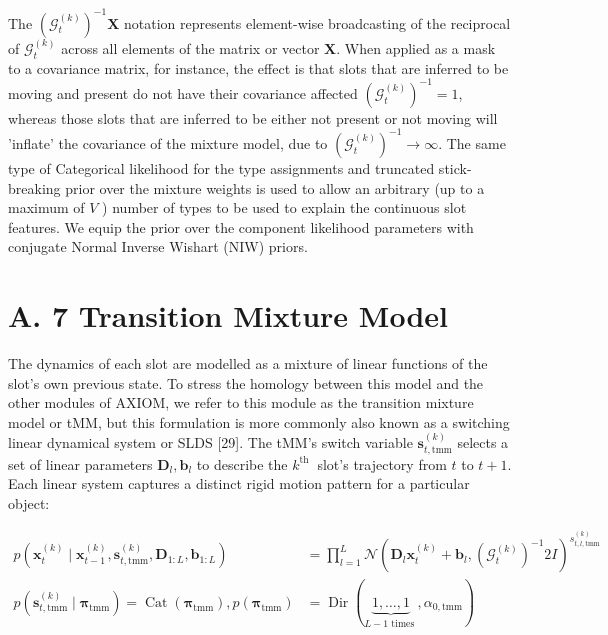 \documentclass[10pt]{article}
\begin{document}
The $\left(\mathcal{G}_{t}^{(k)}\right)^{-1} \mathbf{X}$ notation represents element-wise broadcasting of the reciprocal of $\mathcal{G}_{t}^{(k)}$ across all elements of the matrix or vector $\mathbf{X}$. When applied as a mask to a covariance matrix, for instance, the effect is that slots that are inferred to be moving and present do not have their covariance affected $\left(\mathcal{G}_{t}^{(k)}\right)^{-1}=1$, whereas those slots that are inferred to be either not present or not moving will 'inflate' the covariance of the mixture model, due to $\left(\mathcal{G}_{t}^{(k)}\right)^{-1} \rightarrow \infty$. The same type of Categorical likelihood for the type assignments and truncated stick-breaking prior over the mixture weights is used to allow an arbitrary (up to a maximum of $V$ ) number of types to be used to explain the continuous slot features. We equip the prior over the component likelihood parameters with conjugate Normal Inverse Wishart (NIW) priors.

\section*{A. 7 Transition Mixture Model}
The dynamics of each slot are modelled as a mixture of linear functions of the slot's own previous state. To stress the homology between this model and the other modules of AXIOM, we refer to this module as the transition mixture model or tMM, but this formulation is more commonly also known as a switching linear dynamical system or SLDS [29]. The tMM's switch variable $\mathbf{s}_{t, \mathrm{tmm}}^{(k)}$ selects a set of linear parameters $\boldsymbol{D}_{l}, \boldsymbol{b}_{l}$ to describe the $k^{\text {th }}$ slot's trajectory from $t$ to $t+1$. Each linear system captures a distinct rigid motion pattern for a particular object:


\begin{align*}
p\left(\mathbf{x}_{t}^{(k)} \mid \mathbf{x}_{t-1}^{(k)}, \mathbf{s}_{t, \mathrm{tmm}}^{(k)}, \boldsymbol{D}_{1: L}, \boldsymbol{b}_{1: L}\right) & =\prod_{l=1}^{L} \mathcal{N}\left(\boldsymbol{D}_{l} \mathbf{x}_{t}^{(k)}+\boldsymbol{b}_{l},\left(\mathcal{G}_{t}^{(k)}\right)^{-1} 2 I\right)^{s_{t, l, \mathrm{tmm}}^{(k)}}  \tag{26}\\
p\left(\mathbf{s}_{t, \mathrm{tmm}}^{(k)} \mid \boldsymbol{\pi}_{\mathrm{tmm}}\right)=\operatorname{Cat}\left(\boldsymbol{\pi}_{\mathrm{tmm}}\right), p\left(\boldsymbol{\pi}_{\mathrm{tmm}}\right) & =\operatorname{Dir}(\underbrace{1, \ldots, 1}_{L-1 \text { times }}, \alpha_{0, \mathrm{tmm}}) \tag{27}
\end{align*}
\end{document}
